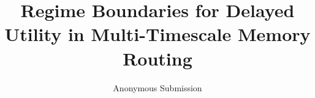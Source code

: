 \documentclass[11pt]{article}
\title{Regime Boundaries for Delayed Utility in Multi-Timescale Memory Routing}
\author{Anonymous Submission}
\date{}
\begin{document}
\maketitle

\begin{abstract}

\end{abstract}











\appendix




\end{document}
